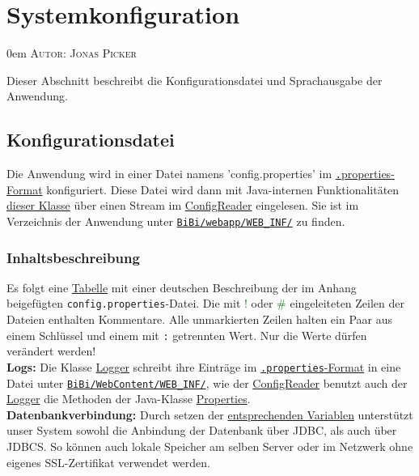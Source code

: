 \documentclass{article}
\makeatletter
\newcommand{\sectionauthor}[1]{
	{\parindent 0em \large \scshape Autor: #1 \par \nobreak \vspace*{1em}}
	\@afterheading
}
\makeatother
\begin{document}
\section{Systemkonfiguration}
\sectionauthor{Jonas Picker}
Dieser Abschnitt beschreibt die Konfigurationsdatei und Sprachausgabe der Anwendung.
\subsection{Konfigurationsdatei}
\indent Die Anwendung wird in einer Datei namens 'config.properties' im \hyperlink{https://de.wikipedia.org/wiki/Java-Properties-Datei}{{\texttt.properties}-Format} konfiguriert. Diese Datei wird dann mit Java-internen Funktionalitäten \hyperlink{https://docs.oracle.com/javase/7/docs/api/java/util/Properties.html}{dieser Klasse} über einen Stream im \hyperlink{ConfigReader}{ConfigReader} eingelesen. Sie ist im Verzeichnis der Anwendung unter \hyperlink{Paketstruktur}{\texttt{BiBi/webapp/WEB\_INF/}} zu finden.
\subsubsection{Inhaltsbeschreibung}
\hypertarget{propSchema}{}
Es folgt eine \hyperlink{tabelle}{Tabelle} mit einer deutschen Beschreibung der im Anhang beigefügten \texttt{config.properties}-Datei. Die mit \textcolor{green}{!} oder \textcolor{green}{\#} eingeleiteten Zeilen der Dateien enthalten Kommentare. Alle unmarkierten Zeilen halten ein Paar aus einem Schlüssel und einem mit \texttt{:} getrennten Wert. Nur die Werte dürfen verändert werden! \\
\textbf{Logs:} Die Klasse \hyperlink{ConfigReader}{Logger} schreibt ihre Einträge im \hyperlink{https://de.wikipedia.org/wiki/Java-Properties-Datei}{\texttt{.properties}-Format} in eine Datei unter \hyperlink{Paketstruktur}{\texttt{BiBi/WebContent/WEB\_INF/}}, wie der \hyperlink{ConfigReader}{ConfigReader} benutzt auch der \hyperlink{ConfigReader}{Logger} die Methoden der Java-Klasse \hyperlink{https://docs.oracle.com/javase/7/docs/api/java/util/Properties.html}{Properties}.\\
\textbf{Datenbankverbindung:} Durch setzen der \hyperlink{DBSSL}{entsprechenden Variablen} unterstützt unser System sowohl die Anbindung der Datenbank über JDBC, als auch über JDBCS. So können auch lokale Speicher am selben Server oder im Netzwerk ohne eigenes SSL-Zertifikat verwendet werden. \\
\end{document}
